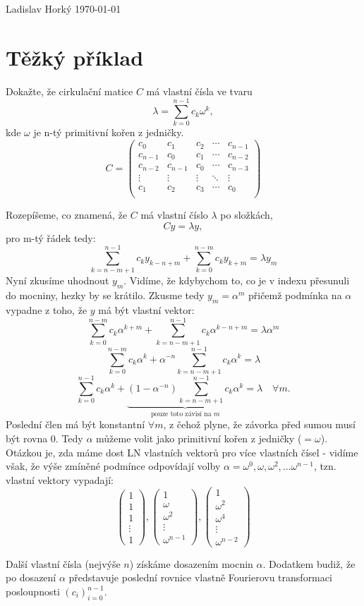 \documentclass[12pt, a4paper]{report}
\begin{document}
Ladislav Horký \hfill \today
\section{Těžký příklad}
Dokažte, že cirkulační matice $C$ má vlastní čísla ve tvaru
\[
\lambda = \sum_{k=0}^{n-1} c_k \omega^k,
\]
kde $\omega$ je n-tý primitivní kořen z jedničky.
\[C=
\begin{pmatrix}
  c_0 & c_1 & c_2 & \cdots & c_{n-1} \\
  c_{n-1} & c_0 & c_1 & \cdots & c_{n-2} \\
  c_{n-2} & c_{n-1} & c_0 & \cdots & c_{n-3} \\
  \vdots & \vdots & \vdots & \ddots & \vdots \\
  c_1 & c_2 & c_3 & \cdots & c_0 \\
\end{pmatrix}
\]

\vspace{1cm}
Rozepíšeme, co znamená, že $C$ má vlastní číslo $\lambda$ po složkách,
\[
Cy = \lambda y,
\]
pro m-tý řádek tedy:
\[
\sum_{k=n-m+1}^{n-1} c_k y_{k-n+m} + \sum_{k=0}^{n-m} c_k y_{k+m} = \lambda y_m
\]
Nyní zkusíme uhodnout $y_m$. Vidíme, že kdybychom to, co je v indexu přesunuli do mocniny, hezky by se krátilo.
Zkusme tedy $y_m = \alpha^m$ přičemž podmínka na $\alpha$ vypadne z toho, že $y$ má být vlastní vektor:
\[
\sum_{k=0}^{n-m} c_k \alpha^{k+m} + \sum_{k=n-m+1}^{n-1} c_k \alpha^{k-n+m} = \lambda \alpha^m
\]
\[
\sum_{k=0}^{n-m} c_k \alpha^{k} + \alpha^{-n}\sum_{k=n-m+1}^{n-1} c_k \alpha^{k} = \lambda
\]
\[
\sum_{k=0}^{n-1} c_k \alpha^{k} + \underbrace{(1-\alpha^{-n})\sum_{k=n-m+1}^{n-1} c_k \alpha^{k}}_
{\text{pouze toto závisí na $m$}} = \lambda \quad\forall m.
\]
Poslední člen má být konstantní $\forall m$, z čehož plyne, že závorka před sumou musí být rovna 0. Tedy $\alpha$ můžeme volit jako primitivní kořen z jedničky ($=\omega$). Otázkou je, zda máme dost LN vlastních vektorů pro více vlastních čísel - vidíme však, že výše zmíněné podmínce odpovídají volby $\alpha = \omega^0, \omega, \omega^2, ... \omega^{n-1}$, tzn. vlastní vektory vypadají:
\[
\begin{pmatrix}
  1 \\ 1 \\ 1 \\ \vdots \\ 1
\end{pmatrix},
\begin{pmatrix}
  1 \\ \omega \\ \omega^2 \\ \vdots \\ \omega^{n-1}
\end{pmatrix},
\begin{pmatrix}
  1 \\ \omega^2 \\ \omega^4 \\ \vdots \\ \omega^{n-2}
\end{pmatrix}
\]

Další vlastní čísla (nejvýše $n$) získáme dosazením mocnin $\alpha$. Dodatkem budiž, že po dosazení $\alpha$ představuje poslední rovnice vlastně Fourierovu transformaci posloupnosti $(c_i)_{i=0}^{n-1}$.
\end{document}
